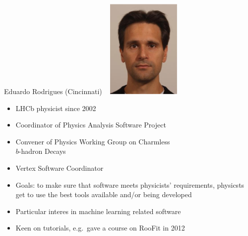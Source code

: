 \documentclass{beamer}
\begin{document}
\begin{frame}{Eduardo Rodrigues (Cincinnati)}
\mbox{ } \hfill \includegraphics[height=2 cm]{eduardo_rodrigues.png}

\vspace{-2 cm}
\begin{itemize}
\item LHCb physicist since 2002
\item Coordinator of Physics Analysis Software Project
\item Convener of Physics Working Group on Charmless \\ $b$-hadron Decays
\item Vertex Software Coordinator
\end{itemize}

\vspace{0.25 cm}
\begin{itemize}
\item Goals: to make sure that software meets physicists' requirements, physicsts get to use the best tools available and/or being developed
\item Particular interes in machine learning related software
\item Keen on tutorials, e.g.\ gave a course on RooFit in 2012
\end{itemize}
\end{frame}
\end{document}
